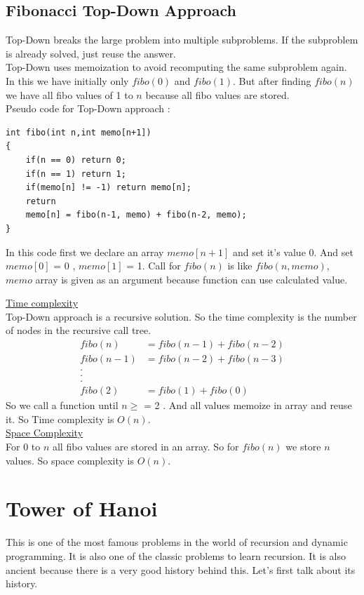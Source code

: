 \documentclass[12pt]{book}
\begin{document}
\section{Fibonacci Top-Down Approach}
Top-Down breaks the large problem into multiple subproblems. If the subproblem is already solved, just reuse the answer.\\
Top-Down uses memoization to avoid recomputing the same subproblem again. In this we have initially only $fibo(0)$ and $fibo(1)$. But after finding $fibo(n)$ we have all fibo values of 1 to $n$ because all fibo values are stored.\\

Pseudo code for Top-Down approach :\\
\begin{lstlisting}
int fibo(int n,int memo[n+1])
{
    if(n == 0) return 0;
    if(n == 1) return 1;
    if(memo[n] != -1) return memo[n];
    return
    memo[n] = fibo(n-1, memo) + fibo(n-2, memo);
}
\end{lstlisting}
In this code first we declare an array $memo[n+1]$ and set it’s value 0. And set $memo[0]$ = 0 , $memo[1]$ = 1.  Call for $fibo(n)$ is like $fibo(n,memo)$, $memo$ array is given as an argument because function can use calculated value.

\underline{Time complexity}\\

Top-Down approach is a recursive solution. So the time complexity is the number of nodes in the recursive call tree.\\
\begin{align*}
	fibo(n) &= fibo(n-1) + fibo(n-2)\\
	fibo(n-1) &= fibo(n-2)+ fibo(n-3)\\
	.\\
	.\\
	.\\
	fibo(2) &= fibo(1)+fibo(0)
\end{align*}
So we call a function until $n \geq$ = 2 . And all values memoize in array and reuse it. So Time complexity is $O(n)$.\\

\underline{Space Complexity}\\

	For 0 to $n$ all fibo values are stored in an array. So for $fibo(n)$ we store $n$ values. So space complexity is $O(n)$.\\

\chapter{Tower of Hanoi}
This is one of the most famous problems in the world of recursion and dynamic programming. It is also one of the classic problems to learn recursion. It is also ancient because there is a very good history behind this. Let’s first talk about its history.\\
\end{document}
